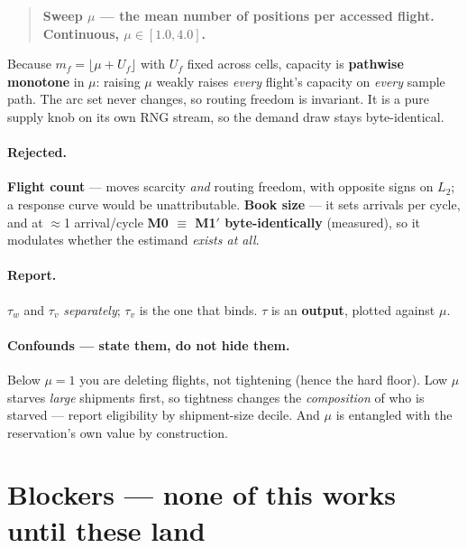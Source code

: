 \documentclass[11pt,a4paper]{article}
\begin{document}
\begin{quote}
\textbf{Sweep $\mu$ --- the mean number of positions per accessed flight. Continuous, $\mu \in [1.0, 4.0]$.}
\end{quote}

Because $m_f = \lfloor \mu + U_f \rfloor$ with $U_f$ fixed across cells, capacity is \textbf{pathwise
monotone} in $\mu$: raising $\mu$ weakly raises \emph{every} flight's capacity on \emph{every} sample path.
The arc set never changes, so routing freedom is invariant. It is a pure supply knob on its own RNG
stream, so the demand draw stays byte-identical.

\paragraph{Rejected.}
\textbf{Flight count} --- moves scarcity \emph{and} routing freedom, with opposite signs on $L_2$; a
response curve would be unattributable. \textbf{Book size} --- it sets arrivals per cycle, and at
$\approx$1 arrival/cycle \textbf{M0 $\equiv$ M1$'$ byte-identically} (measured), so it modulates whether the
estimand \emph{exists at all}.

\paragraph{Report.} $\tau_w$ and $\tau_v$ \emph{separately}; $\tau_v$ is the one that binds. $\tau$ is an
\textbf{output}, plotted against $\mu$.

\paragraph{Confounds --- state them, do not hide them.} Below $\mu = 1$ you are deleting flights, not
tightening (hence the hard floor). Low $\mu$ starves \emph{large} shipments first, so tightness changes the
\emph{composition} of who is starved --- report eligibility by shipment-size decile. And $\mu$ is
entangled with the reservation's own value by construction.

\section{Blockers --- none of this works until these land}
\end{document}
